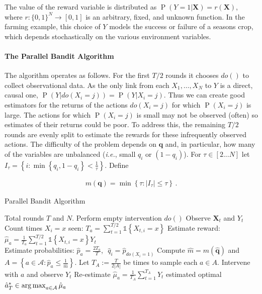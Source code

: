 \documentclass[11pt,a4paper,twoside]{report}
\newcommand{\actions}{\mathcal{A}}
\newcommand{\ie}{\textit{i.e.}}
\newcommand{\set}[1]{\left\{#1\right\}}
\newcommand{\ind}[1]{\mathds{1}\!\!\set{#1}}
\newcommand{\argmax}{\operatornamewithlimits{arg\,max}}
\newcommand{\eq}[1]{\begin{align*}#1\end{align*}}
\renewcommand{\P}[1]{\operatorname{P}\left(#1\right)}
\renewcommand{\vec}[1]{\boldsymbol{#1}}
\theoremstyle{plain}
\theoremstyle{definition}
\begin{document}
The value of the reward variable is distributed as $\P{Y = 1|\vec{X}} = r(\vec{X})$, where 
$r : \{0,1\}^N \to [0,1]$ is an arbitrary, fixed, and unknown function. 
In the farming example, this choice of $Y$ models the success or failure of a seasons crop, 
which depends stochastically on the various environment variables.


\paragraph{The Parallel Bandit Algorithm}
The algorithm operates as follows. For the first $T/2$ rounds it chooses $do()$ to collect observational data. As the only link from each $X_1,\ldots,X_N$ to $Y$ is a direct, causal one, $\P{Y|do(X_i=j)}=\P{Y|X_i=j}$. Thus we can create good estimators for the returns of the actions $do(X_i = j)$ for which $\P{X_i = j}$ is large. The actions for which $\P{X_i = j}$ is small may not be observed (often) so  estimates of their returns could be poor. To address this, the remaining $T/2$ rounds are evenly split to estimate the rewards for these infrequently observed actions. The difficulty of the problem depends on $\vec{q}$ and, in particular, how many of the variables are unbalanced (\ie, small $q_i$ or $(1-q_i)$). For $\tau \in [2...N]$ let $I_\tau = \set{ i : \min\set{q_i, 1-q_i} < \frac{1}{\tau}}$. Define

\eq{
\label{eq:m-simple}
m(\vec{q}) = \min \set{ \tau : |I_{\tau}| \leq \tau}\,.
}


\begin{algorithm}[H]
\caption{Parallel Bandit Algorithm}\label{alg:simple}
\begin{algorithmic}[1]
 Total rounds $T$ and $N$.
\STATE Perform empty intervention $do()$
\STATE Observe $\vec{X}_t$ and $Y_t$
\ENDFOR
\FOR{$a = do(X_i = x) \in \actions$}
\STATE Count times $X_i = x$ seen: $T_a = \sum_{t=1}^{T/2} \ind{X_{t,i} = x}$
\STATE Estimate reward: $\hat{\mu}_a = \frac{1}{T_a} \sum_{t=1}^{T/2} \ind{X_{t,i} = x} Y_t$ \\[0.2cm]
\STATE Estimate probabilities: $\hat{p}_a = \frac{2 T_a}{T}$,\,\, $\hat q_i = \hat p_{do(X_i = 1)}$
\ENDFOR
\STATE Compute $\hat{m} = m(\vec{\hat q})$ and $A = \set{a \in \actions \colon \hat{p}_a \leq \frac{1}{\hat m}}$.
\STATE Let $T_A := \frac{T}{2 |A|}$ be times to sample each $a\in A$.
\STATE Intervene with $a$ and observe $Y_t$
\ENDFOR
\STATE Re-estimate $\hat{\mu}_a = \frac{1}{T_A} \sum_{t=1}^{T_A} Y_t$
\ENDFOR
\RETURN estimated optimal $\hat{a}^*_T \in \argmax_{a\in\actions} \hat{\mu}_a$
\end{algorithmic}
\end{algorithm}
\end{document}
